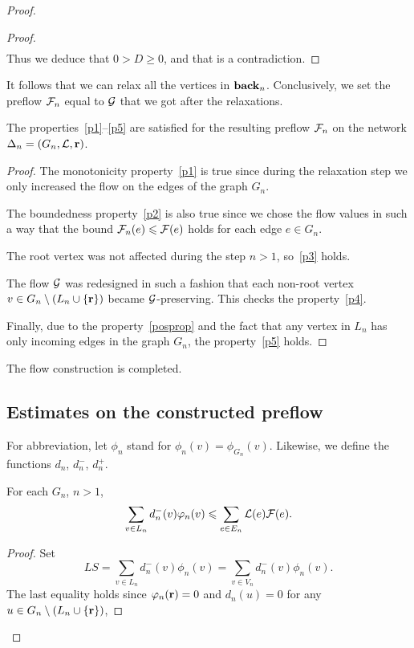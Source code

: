 \documentclass[12pt,oneside,a4paper]{amsart}
\begin{document}
\begin{proof}
\begin{proof}
\[\begin{split}
            \end{split}
          \]
          Thus we deduce that $0 > D \geq 0$, and that is a contradiction.
        \end{proof}
        It follows that we can relax all the vertices in $\eback_n$.
        Conclusively, we set the preflow $\flowposn{n}$ equal to $\cal{G}$ that we got after the relaxations.
        \begin{prop}
          The properties~\ref{p1}--\ref{p5} are satisfied for the resulting preflow $\flowposn{n}$ on the network $\net_n = (G_n, \len, \root)$.
        \end{prop}
        \begin{proof}
          The monotonicity property~\ref{p1} is true since during the relaxation step we
            only increased the flow on the edges of the graph $G_n$.

          The boundedness property~\ref{p2} is also true since we chose the flow values in such a way
            that the bound $\flowposn{n}(e) \leq \flowpos(e)$ holds for each edge $e\in G_n$.

          The root vertex was not affected during the step $n > 1$, so~\ref{p3} holds.

          The flow $\cal{G}$ was redesigned in such a fashion that each non-root vertex $v \in G_{n} \setminus 
            \left(L_n \cup \{\root\}\right)$ became $\cal{G}$-preserving.
          This checks the property~\ref{p4}.

          Finally, due to the property~\ref{posprop} and the fact that
          any vertex in $L_n$ has only incoming edges in the graph $G_n$, the property~\ref{p5} holds.
        \end{proof}
        The flow construction is completed.

        \medskip
        \subsection{Estimates on the constructed preflow}
          For abbreviation, let $\phi_n$ stand for $\phi_n(v) = \phi_{G_n}(v)$.
          Likewise, we define the functions $d_n$, $d^{-}_n$, $d^{+}_n$.
          \begin{lemma}
            For each $G_n$, $n > 1$,
            \begin{equation}
              \label{main-ineq}
              \sum_{v\in L_n}d_{n}^{-}(v) \phi_n(v) \leq \sum_{e \in E_n} \len(e) \flowpos(e).
            \end{equation}
          \end{lemma}
          \begin{proof}
            Set
            \[
              LS = \sum_{v \in L_n} d_n^{-}(v) \phi_n(v) = \sum_{v \in V_n} d_n^{-}(v) \phi_n(v).
            \]
            The last equality holds since $\phi_n(\root) = 0$ and $d_n(u) = 0$
              for any $u \in G_{n} \setminus \left(L_n \cup \{\root\}\right)$,


\end{proof}
\end{proof}
\end{document}

